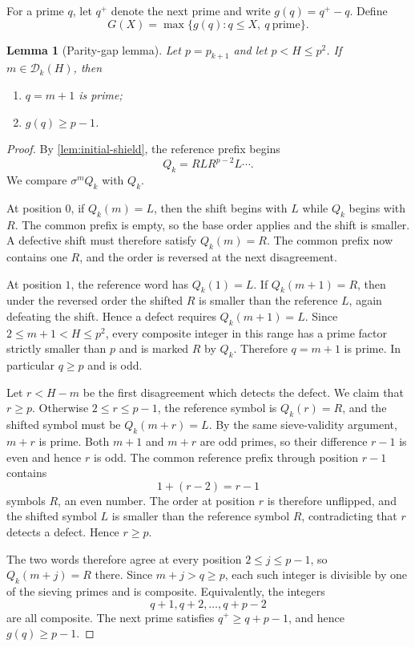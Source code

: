 \documentclass[11pt]{article}
\newtheorem{lemma}[theorem]{Lemma}
\theoremstyle{definition}
\theoremstyle{remark}
\newcommand{\cD}{\mathcal{D}}
\newcommand{\sh}{\sigma}
\begin{document}
For a prime $q$, let $q^+$ denote the next prime and write $g(q)=q^+-q$.  Define
\begin{equation}\label{eq:G-def}
    G(X)=\max\{g(q):q\le X,\ q\ \text{prime}\}.
\end{equation}

\begin{lemma}[Parity-gap lemma]\label{lem:parity-gap}
Let $p=p_{k+1}$ and let $p<H\le p^2$.  If $m\in\cD_k(H)$, then
\begin{enumerate}[label=(\roman*)]
    \item $q=m+1$ is prime;
    \item $g(q)\ge p-1$.
\end{enumerate}
\end{lemma}

\begin{proof}
By \cref{lem:initial-shield}, the reference prefix begins
\[
    Q_k=RLR^{p-2}L\cdots.
\]
We compare $\sh^m Q_k$ with $Q_k$.

At position $0$, if $Q_k(m)=L$, then the shift begins with $L$ while $Q_k$ begins with $R$.  The common prefix is empty, so the base order applies and the shift is smaller.  A defective shift must therefore satisfy $Q_k(m)=R$.  The common prefix now contains one $R$, and the order is reversed at the next disagreement.

At position $1$, the reference word has $Q_k(1)=L$.  If $Q_k(m+1)=R$, then under the reversed order the shifted $R$ is smaller than the reference $L$, again defeating the shift.  Hence a defect requires $Q_k(m+1)=L$.  Since $2\le m+1<H\le p^2$, every composite integer in this range has a prime factor strictly smaller than $p$ and is marked $R$ by $Q_k$.  Therefore $q=m+1$ is prime.  In particular $q\ge p$ and is odd.

Let $r<H-m$ be the first disagreement which detects the defect.  We claim that $r\ge p$.  Otherwise $2\le r\le p-1$, the reference symbol is $Q_k(r)=R$, and the shifted symbol must be $Q_k(m+r)=L$.  By the same sieve-validity argument, $m+r$ is prime.  Both $m+1$ and $m+r$ are odd primes, so their difference $r-1$ is even and hence $r$ is odd.  The common reference prefix through position $r-1$ contains
\[
    1+(r-2)=r-1
\]
symbols $R$, an even number.  The order at position $r$ is therefore unflipped, and the shifted symbol $L$ is smaller than the reference symbol $R$, contradicting that $r$ detects a defect.  Hence $r\ge p$.

The two words therefore agree at every position $2\le j\le p-1$, so $Q_k(m+j)=R$ there.  Since $m+j>q\ge p$, each such integer is divisible by one of the sieving primes and is composite.  Equivalently, the integers
\[
    q+1,q+2,\ldots,q+p-2
\]
are all composite.  The next prime satisfies $q^+\ge q+p-1$, and hence $g(q)\ge p-1$.
\end{proof}
\end{document}
